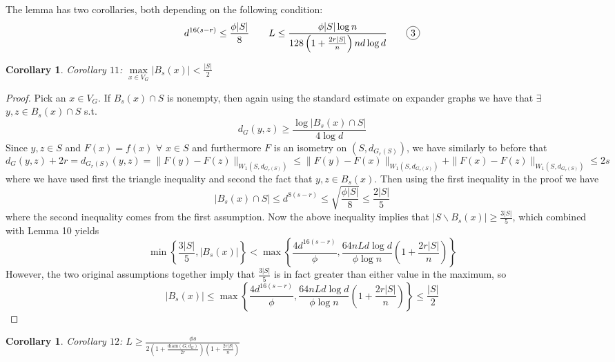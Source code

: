 \documentclass[10pt]{article}
\newtheorem{corollary}[theorem]{Corollary}
\theoremstyle{definition}
\theoremstyle{definition}
\theoremstyle{definition}
\theoremstyle{definition}
\newcommand*\circled[1]{\tikz[baseline=(char.base)]{
		\node[shape=circle,draw,inner sep=2pt] (char) {#1};}}
\begin{document}
\noindent The lemma has two corollaries, both depending on the following condition:
$$d^{16(s-r)}\le\frac{\phi|S|}{8}\qquad L\le\frac{\phi|S|\log n}{128\left(1+\frac{2r|S|}{n}\right)nd\log d}\qquad\circled{3}$$
\begin{corollary} Corollary $11$: $\max\limits_{x\in V_G}|B_s(x)|<\frac{|S|}{2}$
\end{corollary}
\begin{proof}
Pick an $x\in V_G$. If $B_s(x)\cap S$ is nonempty, then again using the standard estimate on expander graphs we have that $\exists$ $y,z\in B_s(x)\cap S$ s.t.
$$d_G(y,z)\ge\frac{\log|B_s(x)\cap S|}{4\log d}$$
Since $y,z\in S$ and $F(x)=f(x)$ $\forall$ $x\in S$ and furthermore $F$ is an isometry on $(S,d_{G_r(S)})$, we have similarly to before that
$$d_G(y,z)+2r=d_{G_r(S)}(y,z)=\|F(y)-F(z)\|_{W_1(S,d_{G_r(S)})}\le\|F(y)-F(x)\|_{W_1(S,d_{G_r(S)})}+\|F(x)-F(z)\|_{W_1(S,d_{G_r(S)})}\le 2s$$
where we have used first the triangle inequality and second the fact that $y,z\in B_s(x)$. Then using the first inequality in the proof we have
$$|B_s(x)\cap S|\le d^{8(s-r)}\le\sqrt{\frac{\phi|S|}{8}}\le\frac{2|S|}{5}$$
where the second inequality comes from the first assumption. Now the above inequality implies that $|S\backslash B_s(x)|\ge\frac{3|S|}{5}$, which combined with Lemma 10 yields
$$\min\left\{\frac{3|S|}{5},|B_s(x)|\right\}<\max\left\{\frac{4d^{16(s-r)}}{\phi},\frac{64nLd\log d}{\phi\log n}\left(1+\frac{2r|S|}{n}\right)\right\}$$
However, the two original assumptions together imply that $\frac{3|S|}{5}$ is in fact greater than either value in the maximum, so
$$|B_s(x)|\le\max\left\{\frac{4d^{16(s-r)}}{\phi},\frac{64nLd\log d}{\phi\log n}\left(1+\frac{2r|S|}{n}\right)\right\}\le\frac{|S|}{2}$$
\end{proof}
\begin{corollary} Corollary $12$: $L\ge\frac{\phi s}{2\left(1+\frac{\textrm{diam}(G,d_G)}{2r}\right)\left(1+\frac{2r|S|}{n}\right)}$
\end{corollary}
\end{document}
